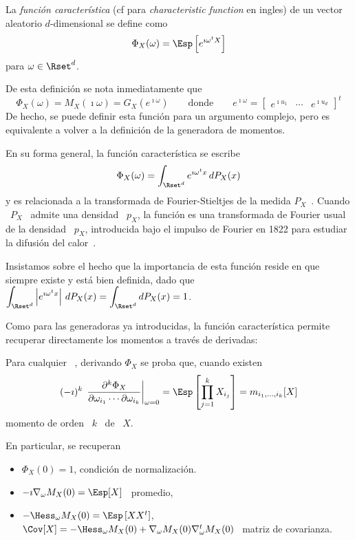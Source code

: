 \begin{definicion}
\label{Def:MP:FuncionCaracteristica}
% 
  La {\em funci\'on caracter\'istica}  (cf para {\em characteristic function} en
  ingles) de un vector aleatorio $d$-dimensional se define como
  \[
  \Phi_X(\omega) = \Esp\left[ e^{\imath \omega^t X} \right]
  \]
  para $\omega \in \Rset^d$.
\end{definicion}
%
De esta definici\'on se nota inmediatamente que
%
\[
\Phi_X(\omega) = M_X(\imath \omega) = G_X\left( e^{\imath \omega} \right) \qquad
\mbox{donde} \qquad e^{\imath \omega}  = \begin{bmatrix} e^{\imath u_1} & \cdots
  & e^{\imath u_d} \end{bmatrix}^t
\]
%
De hecho,  se puede definir esta  funci\'on para un argumento  complejo, pero es
equivalente a volver a la definici\'on de la generadora de momentos.

En su forma general, la funci\'on caracter\'istica se escribe
%
\[
\Phi_X(\omega) = \int_{\Rset^d} e^{\imath \omega^t x} \, dP_X(x)
\]
%
y  es  relacionada   a  la  transformada  de  Fourier-Stieltjes   de  la  medida
$P_X$~\cite[Chap.~5]{Pin09}. Cuando  \ $P_X$ \  admite una densidad \  $p_X$, la
funci\'on  es  una  transformada  de  Fourier  usual de  la  densidad  \  $p_X$,
introducida bajo el  impulso de Fourier en 1822 para  estudiar la difusi\'on del
calor~\cite{Fou22}.

Insistamos sobre  el hecho que  la importancia de  esta funci\'on reside  en que
siempre existe y est\'a bien  definida, dado que \ $\displaystyle \int_{\Rset^d}
\left| e^{\imath \omega^t x} \right| \, dP_X(x) = \int_{\Rset^d} dP_X(x) = 1$.

Como para las generadoras ya introducidas, la funci\'on caracter\'istica permite
recuperar directamente los momentos a trav\'es de derivadas:
%
\begin{lema}
\label{Lem:MP:GeneracionMomentoViaCaracteristica}
%
  Para cualquier \  ,
  derivando $\Phi_X$ se proba que, cuando existen
  \[
  (-   \imath)^k  \,   \left.\frac{\partial^k   \Phi_X}{\partial  \omega_{i_1}
      \cdots    \partial    \omega_{i_k}}\right|_{\omega=0}    =    \Esp\left[
    \prod_{j=1}^k X_{i_j} \right] = m_{i_1,\ldots,i_k}[X]
  \]
  momento de orden \ $k$ \ de \ $X$.
\end{lema}
%
En particular, se recuperan
%
\begin{itemize}
\item $\Phi_X(0) = 1$, condici\'on de normalizaci\'on.
%
\item $- \imath \nabla_\omega M_X(0) = \Esp[X]$ \ promedio,
%
\item  $- \Hess_\omega  M_X(0) =  \Esp\left[ X  X^t \right]$,  \ie $\Cov[X]  = -
  \Hess_\omega M_X(0) + \nabla_\omega M_X(0) \nabla_\omega^t M_X(0)$ \ matriz de
  covarianza.
\end{itemize}

